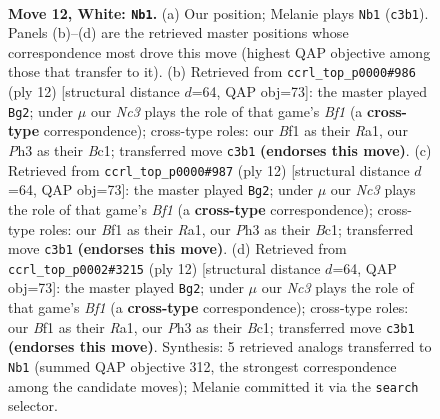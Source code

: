 \documentclass[11pt]{article}
\begin{document}
\clearpage

\begin{figure}[p]\centering
\begin{subfigure}{0.46\textwidth}\centering
\resizebox{\linewidth}{!}{%
\newchessgame
\chessboard[
  setfen={rnb1k2r/4bp2/1q2pnp1/p2p3p/3P3N/2N4P/PP3PP1/R1BQKBR1 w Qkq - 0 12},
  showmover=false,
  pgfstyle=straightmove, color=movearrow, markmove={c3-b1}
]}
\caption{}
\end{subfigure}\hfill
\begin{subfigure}{0.46\textwidth}\centering
\resizebox{\linewidth}{!}{%
\newchessgame
\chessboard[
  setfen={rn1qkbnr/1b1p1ppp/p3p3/1p6/3NP3/2N3P1/PPP2P1P/R1BQKB1R w KQkq - 1 7},
  showmover=false,
  pgfstyle=straightmove, color=movearrow, markmove={f1-g2}
]}
\caption{}
\end{subfigure}
\\[4pt]
\begin{subfigure}{0.46\textwidth}\centering
\resizebox{\linewidth}{!}{%
\newchessgame
\chessboard[
  setfen={rn1qkbnr/1b1p1ppp/p3p3/1p6/3NP3/2N3P1/PPP2P1P/R1BQKB1R w KQkq - 1 7},
  showmover=false,
  pgfstyle=straightmove, color=movearrow, markmove={f1-g2}
]}
\caption{}
\end{subfigure}\hfill
\begin{subfigure}{0.46\textwidth}\centering
\resizebox{\linewidth}{!}{%
\newchessgame
\chessboard[
  setfen={rn1qkbnr/1b1p1ppp/p3p3/1p6/3NP3/2N3P1/PPP2P1P/R1BQKB1R w KQkq - 1 7},
  showmover=false,
  pgfstyle=straightmove, color=movearrow, markmove={f1-g2}
]}
\caption{}
\end{subfigure}
\caption{\textbf{Move 12, White: \texttt{Nb1}.} (a) Our position; Melanie plays \texttt{Nb1} (\texttt{c3b1}). Panels (b)--(d) are the retrieved master positions whose correspondence most drove this move (highest QAP objective among those that transfer to it). (b) Retrieved from \texttt{ccrl\_top\_p0000\#986} (ply 12) [structural distance $d$=64, QAP obj=73]: the master played \texttt{Bg2}; under $\mu$ our \emph{Nc3} plays the role of that game's \emph{Bf1} (a \textbf{cross-type} correspondence); cross-type roles: our \emph{B}f1 as their \emph{R}a1, our \emph{P}h3 as their \emph{B}c1; transferred move \texttt{c3b1} \textbf{(endorses this move)}. (c) Retrieved from \texttt{ccrl\_top\_p0000\#987} (ply 12) [structural distance $d$=64, QAP obj=73]: the master played \texttt{Bg2}; under $\mu$ our \emph{Nc3} plays the role of that game's \emph{Bf1} (a \textbf{cross-type} correspondence); cross-type roles: our \emph{B}f1 as their \emph{R}a1, our \emph{P}h3 as their \emph{B}c1; transferred move \texttt{c3b1} \textbf{(endorses this move)}. (d) Retrieved from \texttt{ccrl\_top\_p0002\#3215} (ply 12) [structural distance $d$=64, QAP obj=73]: the master played \texttt{Bg2}; under $\mu$ our \emph{Nc3} plays the role of that game's \emph{Bf1} (a \textbf{cross-type} correspondence); cross-type roles: our \emph{B}f1 as their \emph{R}a1, our \emph{P}h3 as their \emph{B}c1; transferred move \texttt{c3b1} \textbf{(endorses this move)}. Synthesis: 5 retrieved analogs transferred to \texttt{Nb1} (summed QAP objective 312, the strongest correspondence among the candidate moves); Melanie committed it via the \texttt{search} selector.}

\end{figure}
\end{document}
